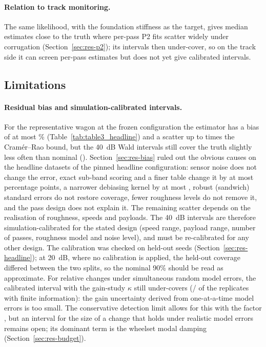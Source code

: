 \paragraph{Relation to track monitoring.} The same likelihood, with the foundation stiffness as the
target, gives median estimates close to the truth where per-pass P2 fits scatter widely under
corrugation (Section~\ref{sec:res-p2}); its intervals then under-cover, so on the track side it can
screen per-pass estimates but does not yet give calibrated intervals.

\subsection{Limitations}\label{sec:limitations}
\paragraph{Residual bias and simulation-calibrated intervals.} For the representative wagon at the
frozen configuration the estimator has a bias of at most \HLBiasAbsMax\% (Table~\ref{tab:table3_headline}) and a scatter up to
\HLRatioCRBMax{} times the Cram\'er--Rao bound, but the 40~dB Wald intervals still cover the truth
slightly less often than nominal (\HLFortyCov). Section~\ref{sec:res-bias} ruled out the obvious causes on the headline datasets of the pinned headline
configuration: sensor
noise does not change the error, exact sub-band scoring and a finer table change it by at most
\ScoreExactMaxDiff{} percentage points, a narrower debiasing kernel by at most \BDYKbMax, robust
(sandwich) standard errors do not restore coverage, fewer roughness levels do not remove it, and the pass
design does not explain it. The remaining scatter depends on the realisation of roughness, speeds and
payloads. The 40~dB intervals are therefore simulation-calibrated for the stated design (speed range,
payload range, number of passes, roughness model and noise level), and must be re-calibrated for any
other design. The calibration was checked on held-out seeds (Section~\ref{sec:res-headline}); at
20~dB, where no calibration is applied, the held-out coverage differed between the two splits, so the
nominal 90\% should be read as approximate.
For relative changes under simultaneous random model errors, the calibrated interval with the gain-study
$\kappa$ still under-covers (\KapCalCovered/\KapCalN{} of the replicates with finite information): the
gain uncertainty derived from one-at-a-time model errors is too small. The conservative detection limit
allows for this with the factor \KapInflNinety, but an interval for the size of a change that holds under
realistic model errors remains open; its dominant term is the wheelset modal damping
(Section~\ref{sec:res-budget}).

